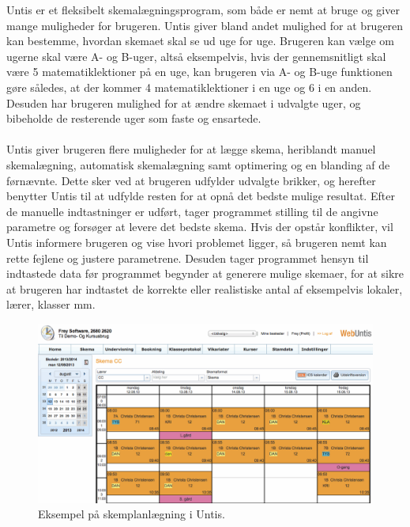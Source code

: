 Untis er et fleksibelt skemalægningsprogram, som både er nemt at bruge og giver mange muligheder for brugeren. Untis giver bland andet mulighed for at brugeren kan bestemme, hvordan skemaet skal se ud uge for uge. Brugeren kan vælge om ugerne skal være A- og B-uger, altså eksempelvis, hvis der gennemsnitligt skal være 5 matematiklektioner på en uge, kan brugeren via A- og B-uge funktionen gøre således, at der kommer 4 matematiklektioner i en uge og 6 i en anden. Desuden har brugeren mulighed for at ændre skemaet i udvalgte uger, og bibeholde de resterende uger som faste og ensartede.
\\\\ 
Untis giver brugeren flere muligheder for at lægge skema, heriblandt manuel skemalægning, automatisk skemalægning samt optimering og en blanding af de førnævnte. Dette sker ved at brugeren udfylder udvalgte brikker, og herefter benytter Untis til at udfylde resten for at opnå det bedste mulige resultat. Efter de manuelle indtastninger er udført, tager programmet stilling til de angivne parametre og forsøger at levere det bedste skema. Hvis der opstår konflikter, vil Untis informere brugeren og vise hvori problemet ligger, så brugeren nemt kan rette fejlene og justere parametrene. Desuden tager programmet hensyn til indtastede data før programmet begynder at generere mulige skemaer, for at sikre at brugeren har indtastet de korrekte eller realistiske antal af eksempelvis lokaler, lærer, klasser mm.
\begin{figure}[!h]
  \centering
  \includegraphics[scale = 0.8]{partials/graphics/untis.png}
  \caption{Eksempel på skemplanlægning i Untis.}
  \label{fig:untis}
\end{figure}
